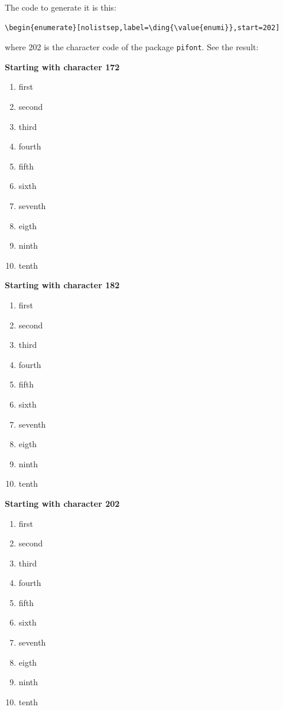 \documentclass[a4paper,
                             twoside,
                             BCOR=1.0cm,
                             DIV=11,
                             parskip=full,
                             11pt]{scrbook}
\providecommand{\minisec}[1]{\par\medskip\noindent\textbf{#1}\par\nobreak\smallskip}
\begin{document}
The code to generate it is this:
\begin{scriptsize}
    \begin{verbatim}
\begin{enumerate}[nolistsep,label=\ding{\value{enumi}},start=202]
\end{verbatim}
\end{scriptsize}
where 202 is the character code of the package \verb+pifont+. See the result:


\minisec{Starting with character 172 }
\begin{enumerate}[nolistsep,label=\ding{\value{enumi}},start=172]
    \item first
    \item second
    \item third
    \item fourth
    \item fifth
    \item sixth
    \item seventh
    \item eigth
    \item ninth
    \item tenth
\end{enumerate}
\minisec{Starting with character 182 }
\begin{enumerate}[nolistsep,label=\ding{\value{enumi}},start=182]
    \item first
    \item second
    \item third
    \item fourth
    \item fifth
    \item sixth
    \item seventh
    \item eigth
    \item ninth
    \item tenth
\end{enumerate}

\minisec{Starting with character 202 }

\begin{enumerate}[nolistsep,label=\ding{\value{enumi}},start=202]
    \item first
    \item second
    \item third
    \item fourth
    \item fifth
    \item sixth
    \item seventh
    \item eigth
    \item ninth
    \item tenth
\end{enumerate}
\end{document}
